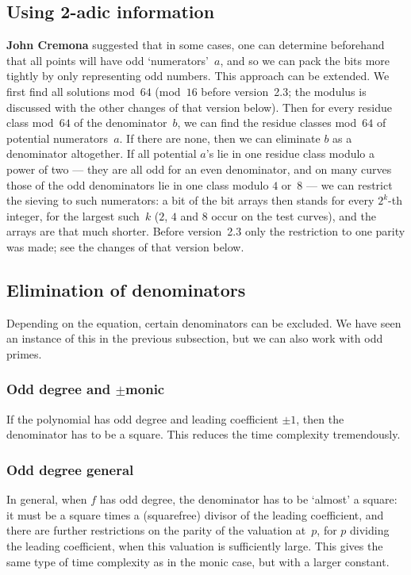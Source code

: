 \documentclass[12pt,a4paper,oneside]{amsart}
\begin{document}
\subsection{Using 2-adic information}

\textbf{John Cremona} suggested that in some cases, one can determine beforehand
that all points will have odd `numerators'~$a$, and so we can pack the
bits more tightly by only representing odd numbers. This approach can be
extended. We first find all solutions mod~$64$ (mod~$16$ before
version~2.3; the modulus is discussed with the other changes of that
version below). Then for every
residue class mod~$64$ of the denominator~$b$, we can find the residue
classes mod~$64$ of potential numerators~$a$. If there are none, then we
can eliminate $b$ as a denominator altogether. If all potential $a$'s lie
in one residue class modulo a power of two --- they are all odd for an even
denominator, and on many curves those of the odd denominators lie in one
class modulo $4$ or~$8$ --- we can restrict the sieving to such numerators:
a bit of the bit arrays then stands for every $2^k$-th integer, for the
largest such~$k$ ($2$, $4$ and $8$ occur on the test curves), and the arrays
are that much shorter. Before version~2.3 only the
restriction to one parity was made; see the changes of that version below.

\subsection{Elimination of denominators}

Depending on the equation, certain denominators can be excluded. We have
seen an instance of this in the previous subsection, but we can also work
with odd primes.

\subsubsection{Odd degree and $\pm$monic}

If the polynomial has odd degree and leading coefficient $\pm 1$, then
the denominator has to be a square. This reduces the time complexity
tremendously.

\subsubsection{Odd degree general}

In general, when $f$ has odd degree, the denominator has to be `almost'
a square: it must be a square times a (squarefree) divisor of the leading
coefficient, and there are further restrictions on the parity of the
valuation at~$p$, for $p$ dividing the leading coefficient, when this
valuation is sufficiently large. This gives the same type of time complexity
as in the monic case, but with a larger constant.
\end{document}
